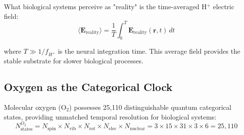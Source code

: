\begin{corollary}
What biological systems perceive as "reality" is the time-averaged H\(^+\) electric field:
\begin{equation}
\langle \mathbf{E}_{\text{reality}} \rangle = \frac{1}{T} \int_0^T \mathbf{E}_{\text{reality}}(\mathbf{r}, t) \, dt
\end{equation}

where $T \gg 1/f_{H^+}$ is the neural integration time. This average field provides the stable substrate for slower biological processes.
\end{corollary}

\subsection{Oxygen as the Categorical Clock}

\begin{theorem}
\label{thm:oxygen_categorical_richness}
Molecular oxygen (O\(_2\)) possesses 25,110 distinguishable quantum categorical states, providing unmatched temporal resolution for biological systems:
\begin{equation}
N_{\text{states}}^{O_2} = N_{\text{spin}} \times N_{\text{vib}} \times N_{\text{rot}} \times N_{\text{elec}} \times N_{\text{nuclear}} = 3 \times 15 \times 31 \times 3 \times 6 = 25{,}110
\end{equation}
\end{theorem}

